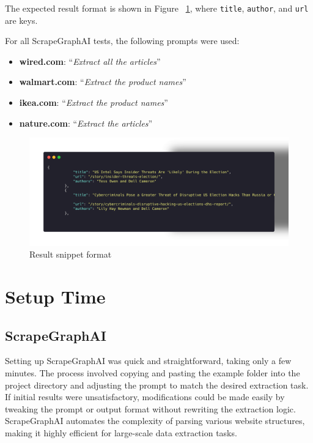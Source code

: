 The expected result format is shown in Figure ~\ref{fig:res-snippet}, where \texttt{title}, \texttt{author}, and \texttt{url} are keys.

For all ScrapeGraphAI tests, the following prompts were used:

\begin{itemize}
    \item \textbf{wired.com}: ``\textit{Extract all the articles}''
    \item \textbf{walmart.com}: ``\textit{Extract the product names}''
    \item \textbf{ikea.com}: ``\textit{Extract the product names}''
    \item \textbf{nature.com}: ``\textit{Extract the articles}''
\end{itemize}

\begin{figure}[H]
    \centering
    \includegraphics[width=0.95\linewidth]{Assets/result.png}
    \caption{Result snippet format}
    \label{fig:res-snippet}
\end{figure}

\section{Setup Time}

\subsection{ScrapeGraphAI}
Setting up ScrapeGraphAI was quick and straightforward, taking only a few minutes. The process involved copying and pasting the example folder into the project directory and adjusting the prompt to match the desired extraction task. If initial results were unsatisfactory, modifications could be made easily by tweaking the prompt or output format without rewriting the extraction logic. ScrapeGraphAI automates the complexity of parsing various website structures, making it highly efficient for large-scale data extraction tasks.

